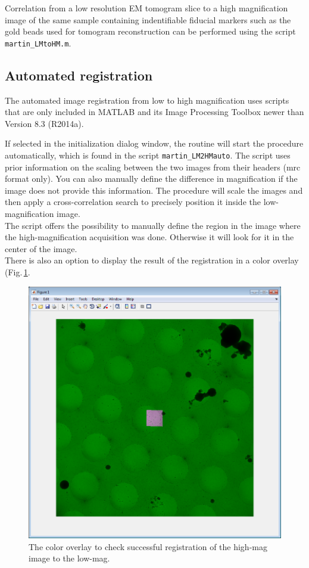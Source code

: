 \documentclass[10pt,a4paper,onepage,DIV12]{scrartcl}
\begin{document}
Correlation from a low resolution EM tomogram slice to a high magnification image of the same sample containing indentifiable fiducial markers such as the gold beads used for tomogram reconstruction can be performed using the script \texttt{martin\_LMtoHM.m}.

\subsection{Automated registration}

The automated image registration from low to high magnification uses scripts that are only included in MATLAB and its Image Processing Toolbox newer than Version 8.3 (R2014a).

If selected in the initialization dialog window, the routine will start the procedure automatically, which is found in the script \texttt{martin\_LM2HMauto}. The script uses prior information on the scaling between the two images from their headers (mrc format only). You can also manually define the difference in magnification if the image does not provide this information. The procedure will scale the images and then apply a cross-correlation search to precisely position it inside the low-magnification image.\\

The script offers the possibility to manually define the region in the image where the high-magnification acquisition was done. Otherwise it will look for it in the center of the image.\\

There is also an option to display the result of the registration in a color overlay (Fig.\,\ref{fig:lmhmauto}. 


\begin{figure}
 \centering
 \includegraphics[width=.68\textwidth]{images/autolmhm}
 \caption{The color overlay to check successful registration of the high-mag image to the low-mag.}
 \label{fig:lmhmauto}
\end{figure}
\end{document}
